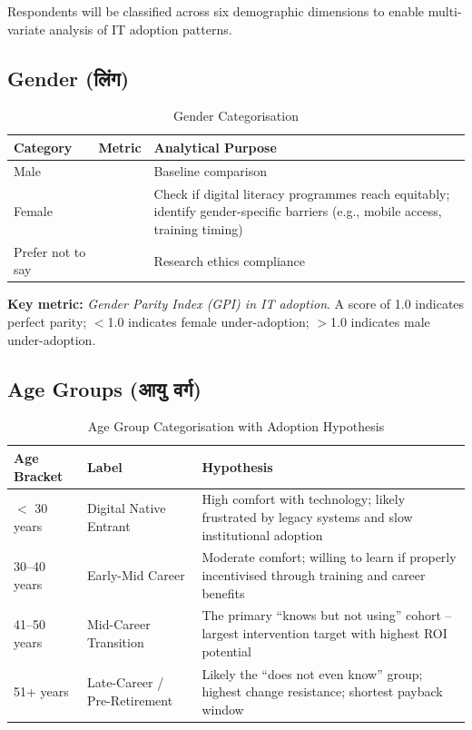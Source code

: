 \documentclass[12pt,a4paper]{article}
\newcommand{\hindi}[1]{{\hindifont #1}}
\begin{document}
Respondents will be classified across six demographic dimensions to enable multi-variate analysis of IT adoption patterns.

\subsection{Gender (\hindi{लिंग})}

\begin{table}[H]
\centering
\caption{Gender Categorisation}
\label{tab:demo_gender}
\begin{tabularx}{\textwidth}{@{}llX@{}}
\toprule
\textbf{Category} & \textbf{Metric} & \textbf{Analytical Purpose} \\
\midrule
Male &  & Baseline comparison \\
Female & & Check if digital literacy programmes reach equitably; identify gender-specific barriers (e.g., mobile access, training timing) \\
Prefer not to say & & Research ethics compliance \\
\bottomrule
\end{tabularx}
\end{table}

\textbf{Key metric:} \textit{Gender Parity Index (GPI) in IT adoption}. A score of 1.0 indicates perfect parity; $<$1.0 indicates female under-adoption; $>$1.0 indicates male under-adoption.

\subsection{Age Groups (\hindi{आयु वर्ग})}

\begin{table}[H]
\centering
\caption{Age Group Categorisation with Adoption Hypothesis}
\label{tab:demo_age}
\begin{tabularx}{\textwidth}{@{}llX@{}}
\toprule
\textbf{Age Bracket} & \textbf{Label} & \textbf{Hypothesis} \\
\midrule
$<$ 30 years & Digital Native Entrant & High comfort with technology; likely frustrated by legacy systems and slow institutional adoption \\
30--40 years & Early-Mid Career & Moderate comfort; willing to learn if properly incentivised through training and career benefits \\
41--50 years & Mid-Career Transition & The primary ``knows but not using'' cohort -- largest intervention target with highest ROI potential \\
51+ years & Late-Career / Pre-Retirement & Likely the ``does not even know'' group; highest change resistance; shortest payback window \\
\bottomrule
\end{tabularx}
\end{table}
\end{document}
